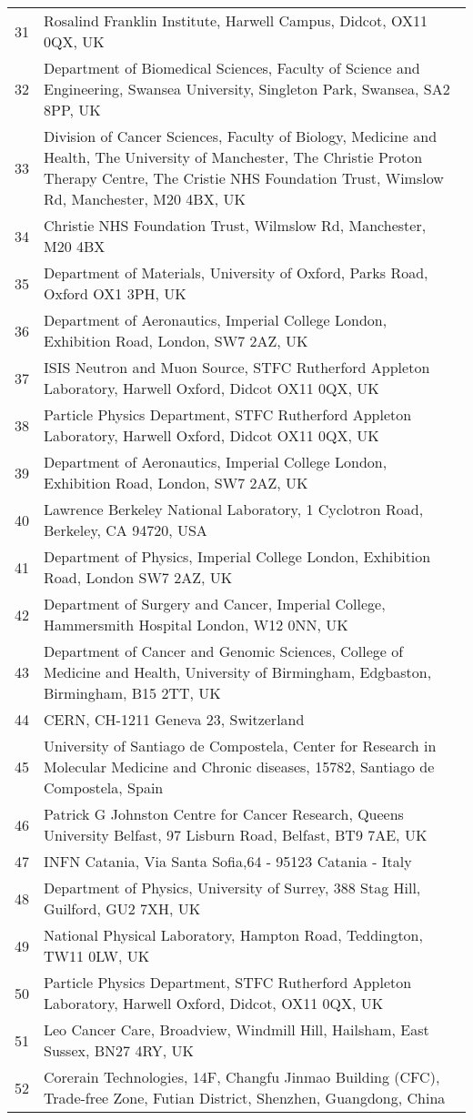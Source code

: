 {\begin{tabular}{ c p{15cm} }
     31 & Rosalind Franklin Institute, Harwell Campus, Didcot, OX11 0QX, UK\\
     32 & Department of Biomedical Sciences, Faculty of Science and Engineering, Swansea University, Singleton Park, Swansea, SA2 8PP, UK\\
     33 & Division of Cancer Sciences, Faculty of Biology, Medicine and Health, The University of Manchester, The Christie Proton Therapy Centre, The Cristie NHS Foundation Trust, Wimslow Rd, Manchester, M20 4BX, UK\\
     34 & Christie NHS Foundation Trust, Wilmslow Rd, Manchester, M20 4BX\\
     35 & Department of Materials, University of Oxford, Parks Road, Oxford OX1 3PH, UK\\
     36 & Department of Aeronautics, Imperial College London, Exhibition Road, London, SW7 2AZ, UK\\
     37 & ISIS Neutron and Muon Source, STFC Rutherford Appleton Laboratory, Harwell Oxford, Didcot OX11 0QX, UK\\
     38 & Particle Physics Department, STFC Rutherford Appleton Laboratory, Harwell Oxford, Didcot OX11 0QX, UK\\
     39 & Department of Aeronautics, Imperial College London, Exhibition Road, London, SW7 2AZ, UK\\
     40 & Lawrence Berkeley National Laboratory, 1 Cyclotron Road, Berkeley, CA 94720, USA\\
     41 & Department of Physics, Imperial College London, Exhibition Road, London SW7 2AZ, UK\\
     42 & Department of Surgery and Cancer, Imperial College, Hammersmith Hospital London, W12 0NN, UK\\
     43 & Department of Cancer and Genomic Sciences, College of Medicine and Health, University of Birmingham, Edgbaston, Birmingham, B15 2TT, UK\\
     44 & CERN, CH-1211 Geneva 23, Switzerland\\
     45 & University of Santiago de Compostela, Center for Research in Molecular Medicine and Chronic diseases, 15782, Santiago de Compostela, Spain\\
     46 & Patrick G Johnston Centre for Cancer Research, Queens University Belfast, 97 Lisburn Road, Belfast, BT9 7AE, UK\\
     47 & INFN Catania, Via Santa Sofia,64 - 95123 Catania - Italy\\
     48 & Department of Physics, University of Surrey, 388 Stag Hill, Guilford, GU2 7XH, UK\\
     49 & National Physical Laboratory, Hampton Road, Teddington, TW11 0LW, UK\\
     50 & Particle Physics Department, STFC Rutherford Appleton Laboratory, Harwell Oxford, Didcot, OX11 0QX, UK\\
     51 & Leo Cancer Care, Broadview, Windmill Hill, Hailsham, East Sussex, BN27 4RY, UK\\
     52 & Corerain Technologies, 14F, Changfu Jinmao Building (CFC), Trade-free Zone, Futian District, Shenzhen, Guangdong, China\\
  \end{tabular}
}
